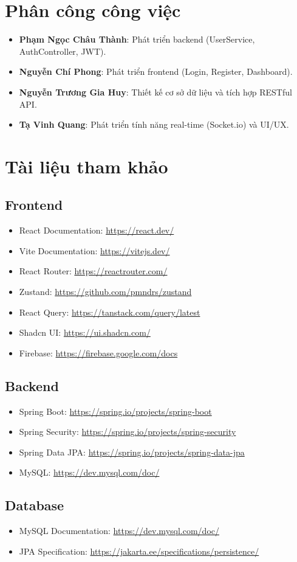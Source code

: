 \documentclass[a4paper,12pt]{article}
\begin{document}
	\section{Phân công công việc}
	\begin{itemize}
		\item \textbf{Phạm Ngọc Châu Thành}: Phát triển backend (UserService, AuthController, JWT).
		\item \textbf{Nguyễn Chí Phong}: Phát triển frontend (Login, Register, Dashboard).
		\item \textbf{Nguyễn Trương Gia Huy}: Thiết kế cơ sở dữ liệu và tích hợp RESTful API.
		\item \textbf{Tạ Vinh Quang}: Phát triển tính năng real-time (Socket.io) và UI/UX.
	\end{itemize}
	
	\section{Tài liệu tham khảo}
	
	\subsection{Frontend}
	\begin{itemize}
		\item React Documentation: \url{https://react.dev/}
		\item Vite Documentation: \url{https://vitejs.dev/}
		\item React Router: \url{https://reactrouter.com/}
		\item Zustand: \url{https://github.com/pmndrs/zustand}
		\item React Query: \url{https://tanstack.com/query/latest}
		\item Shadcn UI: \url{https://ui.shadcn.com/}
		\item Firebase: \url{https://firebase.google.com/docs}
	\end{itemize}
	
	\subsection{Backend}
	\begin{itemize}
		\item Spring Boot: \url{https://spring.io/projects/spring-boot}
		\item Spring Security: \url{https://spring.io/projects/spring-security}
		\item Spring Data JPA: \url{https://spring.io/projects/spring-data-jpa}
		\item MySQL: \url{https://dev.mysql.com/doc/}
	\end{itemize}
	
	\subsection{Database}
	\begin{itemize}
		\item MySQL Documentation: \url{https://dev.mysql.com/doc/}
		\item JPA Specification: \url{https://jakarta.ee/specifications/persistence/}
	\end{itemize}
	
\end{document}
